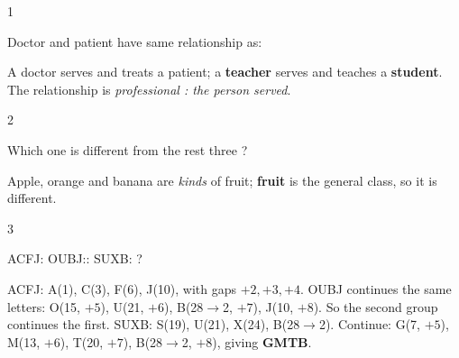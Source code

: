 \begin{question}{1}
{Doctor and patient have same relationship as:\par}
\begin{explain}
A doctor serves and treats a patient; a \textbf{teacher} serves and teaches a \textbf{student}. The relationship is \emph{professional : the person served}.
\end{explain}
\end{question}

\begin{question}{2}
{Which one is different from the rest three ?\par}
\begin{explain}
Apple, orange and banana are \emph{kinds} of fruit; \textbf{fruit} is the general class, so it is different.
\end{explain}
\end{question}

\begin{question}{3}
{ACFJ: OUBJ:: SUXB: ?\par}
\begin{explain}
ACFJ: A(1), C(3), F(6), J(10), with gaps $+2, +3, +4$. OUBJ continues the same letters: O(15, $+5$), U(21, $+6$), B(28$\to$2, $+7$), J(10, $+8$). So the second group continues the first.
SUXB: S(19), U(21), X(24), B(28$\to$2). Continue: G(7, $+5$), M(13, $+6$), T(20, $+7$), B(28$\to$2, $+8$), giving \textbf{GMTB}.
\end{explain}
\end{question}

